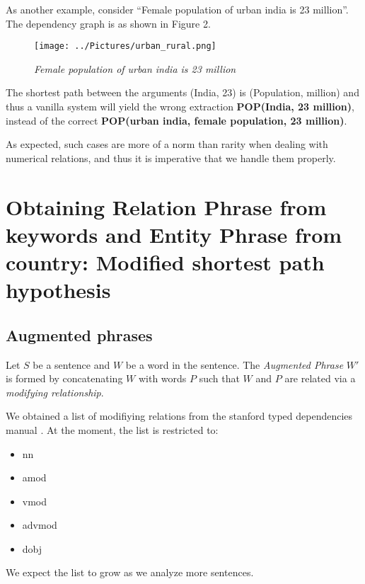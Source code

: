 \documentclass[a4paper,10pt]{article}
\begin{document}
As another example, consider ``Female population of urban india is 23 million''. The dependency graph is as shown in Figure 2.

 \begin{center}
 \begin{figure}
  \texttt{[image: ../Pictures/urban\_rural.png]}
 \caption{\emph{Female population of urban india is 23 million}}
 \end{figure}
\end{center}

The shortest path between the arguments  (India, 23) is (Population, million) and thus a vanilla
system will yield the wrong extraction \textbf{\color{red} POP(India, 23 million)}, instead of the correct \textbf{\color{red} POP(urban india, female population, 23 million)}.

As expected, such cases are more of a norm than rarity when dealing with numerical relations, and thus it is imperative that we handle them 
properly.

\section{Obtaining Relation Phrase from keywords and Entity Phrase from country: Modified shortest path hypothesis}

\subsection{Augmented phrases}
Let $S$ be a sentence and $W$ be a word in the sentence. The \emph{Augmented Phrase} $W'$ is formed by concatenating $W$ with words $P$ such that
$W$ and $P$ are related via a \emph{modifying relationship}.

We obtained a list of modifiying relations from the stanford typed dependencies manual \cite{de2008stanford}.
At the moment, the list is restricted to:
\begin{itemize}
\item nn
\item amod
\item vmod
\item advmod
\item dobj
\end{itemize}
We expect the list to grow as we analyze more sentences.
\end{document}
